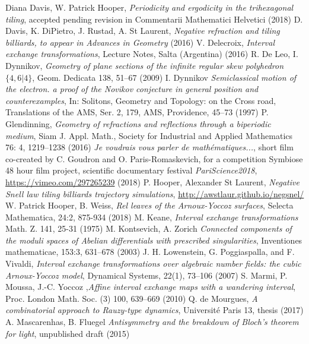 \documentclass[12pt]{article}
\theoremstyle{definition}
\begin{document}
\begin{thebibliography}{99}
 Diana Davis, W. Patrick Hooper, \emph{Periodicity and ergodicity in the trihexagonal tiling}, accepted pending revision in Commentarii Mathematici Helvetici (2018)
 D. Davis, K. DiPietro, J. Rustad, A. St Laurent, \emph{Negative refraction and tiling billiards, to appear in Advances in Geometry} (2016)
 V. Delecroix, \emph{Interval exchange transformations}, Lecture Notes, Salta (Argentina) (2016)
 R. De Leo, I. Dynnikov, \emph{Geometry of plane sections of the infinite regular skew polyhedron }$\{4, 6 \left|\right. 4\}$, Geom. Dedicata 138, 51–67 (2009)
 I. Dynnikov \emph{Semiclassical motion of the electron. a proof of the Novikov conjecture in general position and counterexamples}, In: Solitons, Geometry and Topology: on the Cross road, Translations of the AMS, Ser. 2, 179, AMS, Providence, 45–73 (1997)
 P. Glendinning, \emph{Geometry of refractions and reflections through a biperiodic medium}, Siam J. Appl. Math., Society for Industrial and Applied Mathematics 76: 4, 1219–1238 (2016)
 \emph{Je voudrais vous parler de mathématiques...}, short film co-created by C. Goudron and O. 
Paris-Romaskevich, for a competition Symbiose 48 hour film project, scientific documentary festival \emph{PariScience2018}, 
\url{https://vimeo.com/297265239}
(2018) 
 P. Hooper, Alexander St Laurent, \emph{Negative Snell law tiling billiards trajectory simulations}, 
\url{http://awstlaur.github.io/negsnel/}
 W. Patrick Hooper, B. Weiss,\emph{ Rel leaves of the Arnoux-Yoccoz surfaces}, Selecta Mathematica, 24:2, 875-934 (2018)
 M. Keane, \emph{Interval exchange transformations} Math. Z. 141, 25-31 (1975)
 M. Kontsevich, A. Zorich \emph{Connected components of the moduli spaces of Abelian differentials with prescribed singularities}, Inventiones mathematicae, 153:3, 631--678 (2003)
 J. H. Lowenstein, G. Poggiaspalla, and F. Vivaldi, \emph{Interval exchange transformations over algebraic number fields: the cubic Arnoux-Yoccoz model}, Dynamical Systems, 22(1), 73--106 (2007)
 S. Marmi, P. Moussa, J.-C. Yoccoz ,\emph{Affine interval exchange maps with a wandering interval}, Proc. London Math. Soc. (3) 100, 639--669 (2010)
  Q. de Mourgues, \emph{A combinatorial approach to Rauzy-type dynamics}, Université Paris 13, thesis (2017)
 A. Mascarenhas, B. Fluegel \emph{Antisymmetry and the breakdown of Bloch's theorem for light}, unpublished draft (2015)

\end{thebibliography}
\end{document}

